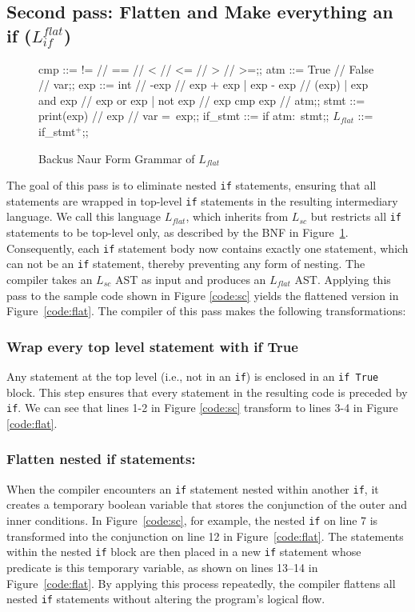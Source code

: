 \subsection{Second pass: Flatten and Make everything an if ($L_{if}^{flat}$)}
\begin{figure}[h!]
	\centering
	\begin{bnf}[row{-} = {bg = gray9}]
		cmp ::= != // == // < // <= // > // >=;;
		atm ::= True // False // var;;
		exp ::= int  // -exp // exp + exp 
		| exp - exp // (exp)
		| exp and exp // exp or exp 
		| not exp // exp cmp exp // atm;;
		stmt ::= print(exp) // exp // var = exp;;
		if\_stmt ::= if atm$\colon$ stmt;;
		$L_{flat}$ ::= if\_stmt$^+$;;
	\end{bnf}
	\caption{Backus Naur Form Grammar of $L_{flat}$}
	\label{bnf:flat}
\end{figure}

The goal of this pass is to eliminate nested \texttt{if} statements, ensuring that all statements are wrapped in top-level \texttt{if} statements in the resulting intermediary language. We call this language $L_{flat}$, which inherits from $L_{sc}$ but restricts all \texttt{if} statements to be top-level only, as described by the BNF in Figure~\ref{bnf:flat}. Consequently, each \texttt{if} statement body now contains exactly one statement, which can not be an \texttt{if} statement, thereby preventing any form of nesting. The compiler takes an $L_{sc}$ AST as input and produces an $L_{flat}$ AST. Applying this pass to the sample code shown in Figure \ref{code:sc} yields the flattened version in Figure~\ref{code:flat}. The compiler of this pass makes the following transformations:

\subsubsection{Wrap every top level statement with if True} Any statement at the top level (i.e., not in an \texttt{if}) is enclosed in an \texttt{if True} block. This step ensures that every statement in the resulting code is preceded by \texttt{if}. We can see that lines 1-2 in Figure \ref{code:sc} transform to lines 3-4 in Figure \ref{code:flat}.

\subsubsection{Flatten nested if statements:}
When the compiler encounters an \texttt{if} statement nested within another \texttt{if}, it creates a temporary boolean variable that stores the conjunction of the outer and inner conditions. In Figure~\ref{code:sc}, for example, the nested \texttt{if} on line 7 is transformed into the conjunction on line 12 in Figure~\ref{code:flat}. The statements within the nested \texttt{if} block are then placed in a new \texttt{if} statement whose predicate is this temporary variable, as shown on lines 13–14 in Figure~\ref{code:flat}. By applying this process repeatedly, the compiler flattens all nested \texttt{if} statements without altering the program’s logical flow.

